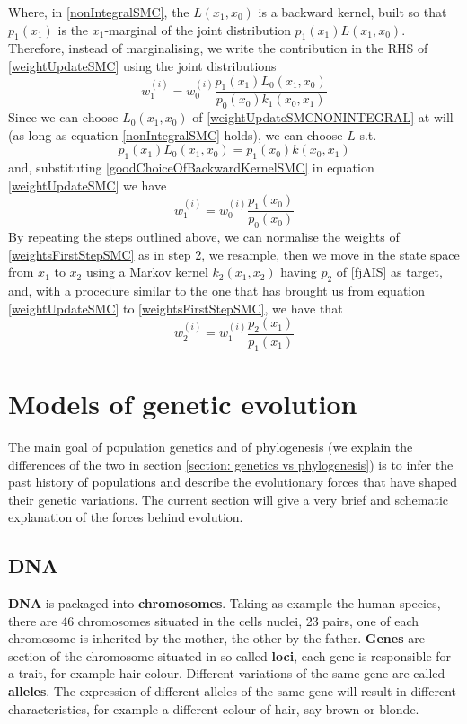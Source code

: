 \documentclass[12pt,mythesisstyle]{report}
\begin{document}
Where, in \eqref{nonIntegralSMC}, the $L(x_1,x_0)$ is a backward kernel, built so that $p_1(x_1)$ is the $x_1$-marginal of the joint distribution $p_1(x_1)L(x_1,x_0)$. Therefore, instead of marginalising, we write the contribution in the RHS of \eqref{weightUpdateSMC} using the joint distributions
\begin{equation}\label{weightUpdateSMCNONINTEGRAL}
w^{(i)}_1=w^{(i)}_0\frac{p_1(x_1)L_0(x_1,x_0)}{p_0(x_0)k_1(x_0,x_1)}
\end{equation}
Since we can choose $L_0(x_1,x_0)$ of \eqref{weightUpdateSMCNONINTEGRAL} at will (as long as equation \eqref{nonIntegralSMC} holds), we can choose $L$ s.t.
\begin{equation}\label{goodChoiceOfBackwardKernelSMC}
p_1(x_1)L_0(x_1,x_0)=p_1(x_0)k(x_0,x_1)
\end{equation}
and, substituting \eqref{goodChoiceOfBackwardKernelSMC} in equation \eqref{weightUpdateSMC} we have
\begin{equation}\label{weightsFirstStepSMC}
w^{(i)}_1=w^{(i)}_0\frac{p_1(x_0)}{p_0(x_0)}
\end{equation}
By repeating the steps outlined above, we can normalise the weights of \eqref{weightsFirstStepSMC} as in step 2, we resample, then we move in the state space from $x_1$ to $x_2$ using a Markov kernel $k_2(x_1,x_2)$ having $p_2$ of \eqref{fjAIS} as target, and, with a procedure similar to the one that has brought us from equation \eqref{weightUpdateSMC} to \eqref{weightsFirstStepSMC}, we have that
\begin{equation}\label{weightsSecondStepSMC}
w^{(i)}_2=w^{(i)}_1\frac{p_2(x_1)}{p_1(x_1)}
\end{equation}

\section{Models of genetic evolution}\label{section: models of genetic evolution}
The main goal of population genetics and of phylogenesis (we explain the differences of the two in section \ref{section: genetics vs phylogenesis}) is to infer the past history of populations and describe the evolutionary forces that have shaped their genetic variations. The current section will give a very brief and schematic explanation of the forces behind evolution.
\subsection{DNA}
\textbf{DNA} is packaged into \textbf{chromosomes}. Taking as example the human species, there are 46 chromosomes situated in the cells nuclei, 23 pairs, one of each chromosome is inherited by the mother, the other by the father. \textbf{Genes} are section of the chromosome situated in so-called \textbf{loci}, each gene is responsible for a trait, for example hair colour. Different variations of the same gene are called \textbf{alleles}. The expression of different alleles of the same gene will result in different characteristics, for example a different colour of hair, say brown or blonde.
\end{document}
